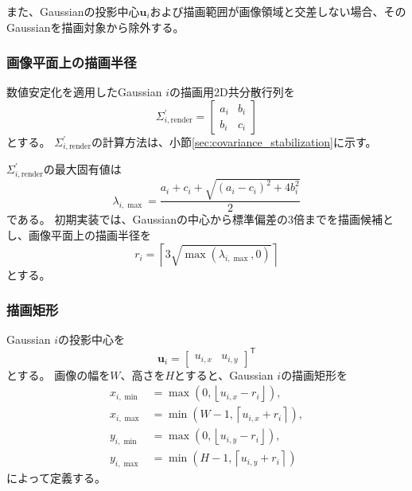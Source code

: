 \documentclass[dvipdfmx]{jlreq}
\begin{document}
また、Gaussianの投影中心$\bm{u}_i$および描画範囲が画像領域と交差しない場合、そのGaussianを描画対象から除外する。

\subsubsection*{画像平面上の描画半径}
数値安定化を適用したGaussian $i$の描画用2D共分散行列を
\begin{equation}
    \Sigma_{i,\mathrm{render}}^{\prime} =
    \begin{bmatrix}
        a_i & b_i\\
        b_i & c_i
    \end{bmatrix}
\end{equation}
とする。
$\Sigma_{i,\mathrm{render}}^{\prime}$の計算方法は、小節\ref{sec:covariance_stabilization}に示す。

$\Sigma_{i,\mathrm{render}}^{\prime}$の最大固有値は
\begin{equation}
    \lambda_{i,\max} = \frac{a_i+c_i+ \sqrt{(a_i-c_i)^2+4b_i^2}}{2}
    \label{eq:maximum_2d_covariance_eigenvalue}
\end{equation}
である。
初期実装では、Gaussianの中心から標準偏差の3倍までを描画候補とし、画像平面上の描画半径を
\begin{equation}
    r_i = \left\lceil 3 \sqrt{\max\left( \lambda_{i,\max}, 0 \right)} \right\rceil
    \label{eq:gaussian_rendering_radius}
\end{equation}
とする。

\subsubsection*{描画矩形}
Gaussian $i$の投影中心を
\begin{equation}
    \bm{u}_i = \begin{bmatrix} u_{i,x} & u_{i,y} \end{bmatrix}^{\mathsf T}
\end{equation}
とする。
画像の幅を$W$、高さを$H$とすると、Gaussian $i$の描画矩形を
\begin{equation}
    \begin{aligned}
        x_{i,\min} &= \max\left( 0, \left\lfloor u_{i,x}-r_i\right\rfloor \right),\\
        x_{i,\max} &= \min\left( W-1, \left\lceil u_{i,x}+r_i\right\rceil \right),\\
        y_{i,\min} &= \max\left( 0, \left\lfloor u_{i,y}-r_i\right\rfloor \right),\\
        y_{i,\max} &= \min\left( H-1, \left\lceil u_{i,y}+r_i\right\rceil \right)
    \end{aligned}
    \label{eq:gaussian_rendering_rectangle}
\end{equation}
によって定義する。
\end{document}
